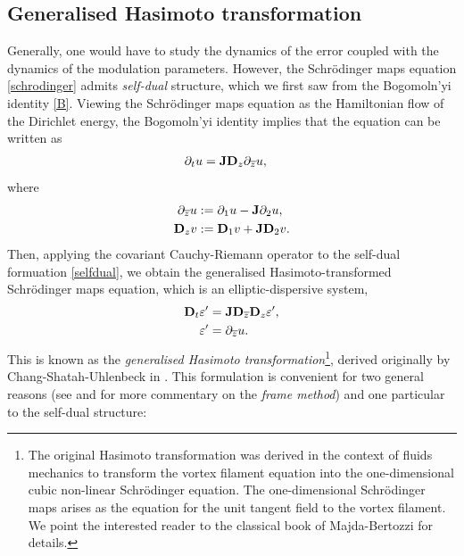 \subsection{Generalised Hasimoto transformation}
	Generally, one would have to study the dynamics of the error coupled with the dynamics of the modulation parameters. However, the Schr\"odinger maps equation \eqref{schrodinger} admits \textit{self-dual} structure, which we first saw from the Bogomoln'yi identity \eqref{B}. Viewing the Schr\"odinger maps equation as the Hamiltonian flow of the Dirichlet energy, the Bogomoln'yi identity implies that the equation can be written as  
	\begin{equation}\label{eq:selfdual}
		\begin{split}
			\partial_t u 
				&= {\bf J} {\bf D}_z \partial_{\overline z} u,
		\end{split}
	\end{equation}
    where 
    \begin{align*}
        \partial_{\overline z} u  
            &:= \partial_1 u - {\bf J} \partial_2 u ,\\
        {\bf D}_z v 
            &:= {\bf D}_1 v + {\bf J} {\bf D}_2 v. 
    \end{align*}
Then, applying the covariant Cauchy-Riemann operator to the self-dual formuation \eqref{selfdual}, we obtain the generalised Hasimoto-transformed Schr\"odinger maps equation, which is an elliptic-dispersive system,
    \begin{align}
        {\bf D}_t \varepsilon'
            &= {\bf J} {\bf D}_{\overline z} {\bf D}_z \varepsilon' \label{eq:hasimoto2},\\
        \varepsilon'
            &= \partial_{\overline z} u . \label{eq:hasimoto3}
    \end{align}
This is known as the \textit{generalised Hasimoto transformation}\footnote{The original Hasimoto transformation was derived in the context of fluids mechanics to transform the vortex filament equation into the one-dimensional cubic non-linear Schr\"odinger equation. The one-dimensional Schr\"odinger maps arises as the equation for the unit tangent field to the vortex filament. We point the interested reader to the classical book of Majda-Bertozzi \cite[Chapter 7.1]{MajdaBertozzi2002} for details. 
}, derived originally by Chang-Shatah-Uhlenbeck in \cite{ChangEtAl2000}. 
This formulation is convenient for two general reasons (see \cite[Chapter 6.2]{Tao2006} and \cite[Chapter 2.5]{KochEtAl2014} for more commentary on the \textit{frame method}) and one particular to the self-dual structure: 
